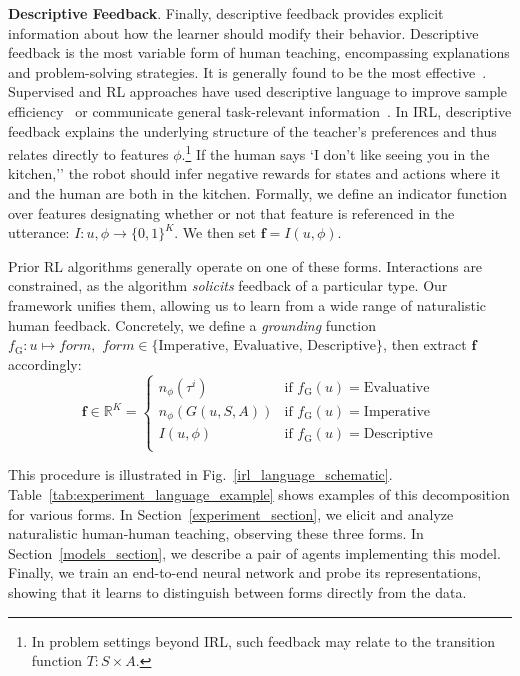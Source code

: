 \documentclass[letterpaper]{article} %
\begin{document}
\textbf{Descriptive Feedback}. Finally, descriptive feedback provides explicit information about how the learner should modify their behavior. Descriptive feedback is the most variable form of human teaching, encompassing explanations and problem-solving strategies. It is generally found to be the most effective~\citep{shute_2008, Lipnevich_education, van_der_klej_2015, Hattie_2007}. Supervised and RL approaches have used descriptive language to improve sample efficiency~\citep{srivastava2017_explanation, Hancock_2018_explanation, Ling2017_captions} or communicate general task-relevant information~\citep{narasimhan2018grounding}. In IRL, descriptive feedback explains the underlying structure of the teacher's preferences and thus relates directly to features $\phi$.\footnote{In problem settings beyond IRL, such feedback may relate to the transition function $T: S\times A$.} If the human says `I don't like seeing you in the kitchen,'' the robot should infer negative rewards for states and actions where it and the human are both in the kitchen. Formally, we define an indicator function over features designating whether or not that feature is referenced in the utterance: $I: u, \phi \rightarrow \{0,1\}^K$. We then set $\mathbf{f} = I(u, \phi)$.

Prior RL algorithms generally operate on one of these forms. Interactions are constrained, as the algorithm \emph{solicits} feedback of a particular type. Our framework unifies them, allowing us to learn from a wide range of naturalistic human feedback. Concretely, we define a \textit{grounding} function $f_\text{G}:u \mapsto \textit{form}, \textit{ form} \in\{\text{Imperative, Evaluative, Descriptive}\}$, then extract $\mathbf{f}$ accordingly:
\begin{equation}
\textbf{f} \in \mathbb{R}^K =
\begin{cases}
n_\phi(\tau^i) & \text{if } f_\text{G}(u) = \text{Evaluative} \\
n_\phi(G(u, S, A)) & \text{if } f_\text{G}(u) = \text{Imperative} \\
I(u, \phi) & \text{if } f_\text{G}(u) = \text{Descriptive} \\
\end{cases}
\label{forms_equation}
\end{equation}

This procedure is illustrated in Fig.~\ref{irl_language_schematic}. Table~\ref{tab:experiment_language_example} shows examples of this decomposition for various forms. In Section~\ref{experiment_section}, we elicit and analyze naturalistic human-human teaching, observing these three forms. In Section~\ref{models_section}, we describe a pair of agents implementing this model. Finally, we train an end-to-end neural network and probe its representations, showing that it learns to distinguish between forms directly from the data.
\end{document}

